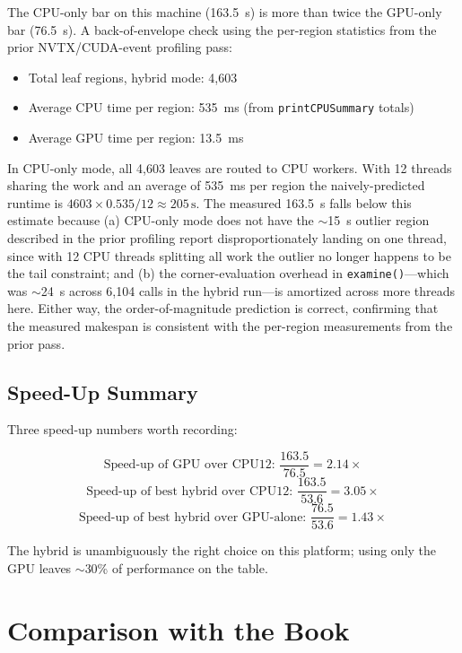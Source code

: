 \documentclass[
	english,
	letterpaper, oneside
]{article}
\begin{document}
The CPU-only bar on this machine (163.5~s) is more than twice the
GPU-only bar (76.5~s). A back-of-envelope check using the per-region
statistics from the prior NVTX/CUDA-event profiling pass:

\begin{itemize}
    \item Total leaf regions, hybrid mode: 4{,}603
    \item Average CPU time per region: 535~ms (from
    \texttt{printCPUSummary} totals)
    \item Average GPU time per region: 13.5~ms
\end{itemize}

In CPU-only mode, all 4{,}603 leaves are routed to CPU workers. With 12
threads sharing the work and an average of 535~ms per region the
naively-predicted runtime is
$4603 \times 0.535 / 12 \approx 205\,\text{s}$. The measured 163.5~s
falls below this estimate because (a) CPU-only mode does not have the
$\sim$15~s outlier region described in the prior profiling report
disproportionately landing on one thread, since with 12 CPU threads
splitting all work the outlier no longer happens to be the tail
constraint; and (b) the corner-evaluation overhead in
\texttt{examine()}---which was $\sim$24~s across 6{,}104 calls in the
hybrid run---is amortized across more threads here. Either way, the
order-of-magnitude prediction is correct, confirming that the measured
makespan is consistent with the per-region measurements from the prior
pass.

\subsection{Speed-Up Summary}

Three speed-up numbers worth recording:

\[
\text{Speed-up of GPU over CPU12: } \frac{163.5}{76.5} = 2.14\times
\]
\[
\text{Speed-up of best hybrid over CPU12: } \frac{163.5}{53.6} = 3.05\times
\]
\[
\text{Speed-up of best hybrid over GPU-alone: } \frac{76.5}{53.6} = 1.43\times
\]

The hybrid is unambiguously the right choice on this platform; using
only the GPU leaves $\sim$30\% of performance on the table.

\section{Comparison with the Book}
\end{document}
